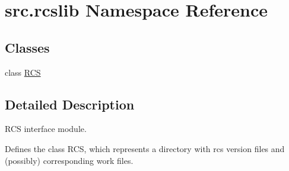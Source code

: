 \hypertarget{namespacesrc_1_1rcslib}{\section{src.\-rcslib Namespace Reference}
\label{namespacesrc_1_1rcslib}
}
\subsection*{Classes}
\begin{DoxyCompactItemize}
\item 
class \hyperlink{classsrc_1_1rcslib_1_1_r_c_s}{R\-C\-S}
\end{DoxyCompactItemize}


\subsection{Detailed Description}
\begin{DoxyVerb}RCS interface module.

Defines the class RCS, which represents a directory with rcs version
files and (possibly) corresponding work files.\end{DoxyVerb}
 